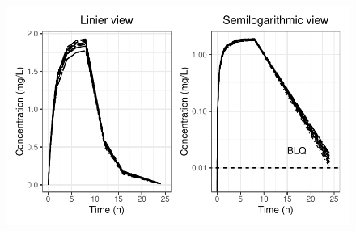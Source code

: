 \documentclass[
  letterpaper,
  DIV=11,
  numbers=noendperiod]{scrreprt}
\begin{document}
\begin{figure}[H]

{\centering \includegraphics{output_flow2_files/figure-pdf/nca3-1.pdf}

}

\end{figure}
\end{document}
